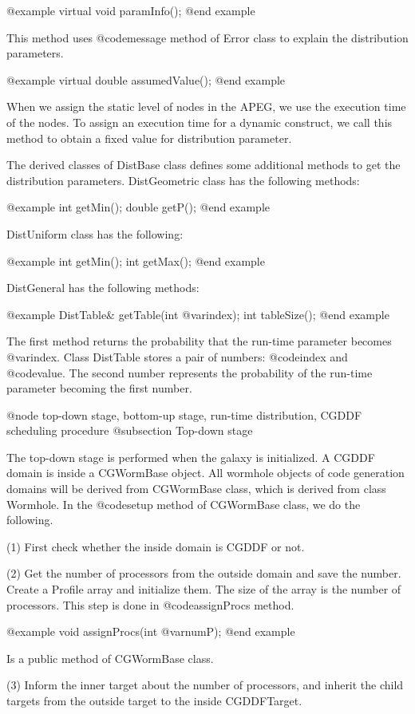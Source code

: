 {@example
virtual void paramInfo();
@end example

This method uses @code{message} method of Error class to explain
the distribution parameters.

@example
virtual double assumedValue();
@end example

When we assign the static level of nodes in the APEG, we use the
execution time of the nodes. To assign an execution time for
a dynamic construct, we call this method to obtain a fixed
value for distribution parameter.

The derived classes of DistBase class defines some additional
methods to get the distribution parameters. DistGeometric class
has the following methods:

@example
int getMin();
double getP();
@end example

DistUniform class has the following:

@example
int getMin();
int getMax();
@end example

DistGeneral has the following methods:

@example
DistTable& getTable(int @var{index});
int tableSize();
@end example

The first method returns the probability that the run-time parameter
becomes @var{index}. Class DistTable stores a pair of numbers:
@code{index} and @code{value}. The second number represents the
probability of the run-time parameter becoming the first number.

@node top-down stage, bottom-up stage, run-time distribution, CGDDF scheduling procedure
@subsection Top-down stage

The top-down stage is performed when the galaxy is initialized.
A CGDDF domain is inside a CGWormBase object. All wormhole objects of
code generation domains will be derived from CGWormBase class, which
is derived from class Wormhole. In the @code{setup} method of
CGWormBase class, we do the following.

(1) First check whether the inside domain is CGDDF or not.

(2) Get the number of processors from the outside domain and save the number.
Create a Profile array and initialize them. The size of the array is the
number of processors. This step is done in @code{assignProcs} method.

@example
void assignProcs(int @var{numP});
@end example

Is a public method of CGWormBase class.

(3) Inform the inner target about the number of processors, and inherit
the child targets from the outside target to the inside CGDDFTarget.

}
